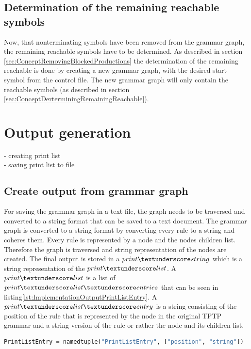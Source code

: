 \subsection{Determination of the remaining reachable symbols}
Now, that nonterminating symbols have been removed from the grammar graph, the remaining reachable symbols have to be determined.
As described in section \ref{sec:ConceptRemovingBlockedProductions} the determination of the remaining reachable is done by creating a new grammar graph, with the desired start symbol from the control file.
The new grammar graph will only contain the reachable symbols (as described in section \ref{sec:ConceptDerterminingRemainingReachable}). 

\section{Output generation}\label{sec:ImplementationOutputGeneration}

- creating print list \\
- saving print list to file



\subsection{Create output from grammar graph}\label{sec:ImplementationOutputGrammarGraph}

For saving the grammar graph in a text file, the graph needs to be traversed and converted to a string format that can be saved to a text document. The grammar graph is converted to a string format by converting every rule to a string and coheres them. Every rule is represented by a node and the nodes children list. Therefore the graph is traversed and string representation of the nodes are created.
The final output is stored in a $print\textunderscore string$ which is a string representation of the $print\textunderscore list$. A $print\textunderscore list$ is a list of $print\textunderscore list\textunderscore entries$ that can be seen in listing\ref{lst:ImplementationOutputPrintListEntry}. A $print\textunderscore list\textunderscore entry$ is a string consisting of the position of the rule that is represented by the node in the original \ac{TPTP} grammar and a string version of the rule or rather the node and its children list. \\

\begin{lstlisting}[language=Python, basicstyle=\scriptsize	,caption= Print List Entry,label= lst:ImplementationOutputPrintListEntry]
PrintListEntry = namedtuple("PrintListEntry", ["position", "string"])
\end{lstlisting}

